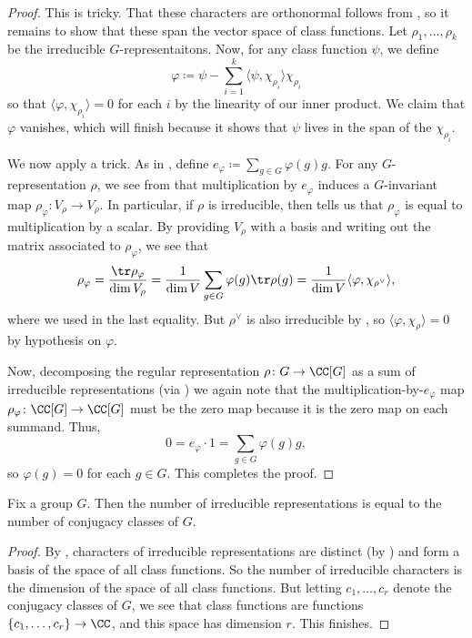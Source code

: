 \documentclass[../main.tex]{subfiles}
\begin{document}
\begin{proof}
	This is tricky. That these characters are orthonormal follows from , so it remains to show that these span the vector space of class functions. Let $\rho_1,\ldots,\rho_k$ be the irreducible $G$-representaitons. Now, for any class function $\psi$, we define
	\[\varphi\coloneqq\psi-\sum_{i=1}^k\langle\psi,\chi_{\rho_i}\rangle\chi_{\rho_i}\]
	so that $\langle\varphi,\chi_{\rho_i}\rangle=0$ for each $i$ by the linearity of our inner product. We claim that $\varphi$ vanishes, which will finish because it shows that $\psi$ lives in the span of the $\chi_{\rho_i}$.

	We now apply a trick. As in , define $e_\varphi\coloneqq\sum_{g\in G}\varphi(g)g$. For any $G$-representation $\rho$, we see from  that multiplication by $e_\varphi$ induces a $G$-invariant map $\rho_\varphi\colon V_\rho\to V_\rho$. In particular, if $\rho$ is irreducible, then  tells us that $\rho_\varphi$ is equal to multiplication by a scalar. By providing $V_\rho$ with a basis and writing out the matrix associated to $\rho_\varphi$, we see that
	\[\rho_\varphi=\frac{\tr\rho_\varphi}{\dim V_\rho}=\frac1{\dim V}\sum_{g\in G}\varphi(g)\tr\rho(g)=\frac1{\dim V}\langle\varphi,\chi_{\rho^\lor}\rangle,\]
	where we used  in the last equality. But $\rho^\lor$ is also irreducible by , so $\langle\varphi,\chi_\rho\rangle=0$ by hypothesis on $\varphi$.

	Now, decomposing the regular representation $\rho\colon G\to\CC[G]$ as a sum of irreducible representations (via ) we again note that the multiplication-by-$e_\varphi$ map $\rho_\varphi\colon\CC[G]\to\CC[G]$ must be the zero map because it is the zero map on each summand. Thus,
	\[0=e_\varphi\cdot1=\sum_{g\in G}\varphi(g)g,\]
	so $\varphi(g)=0$ for each $g\in G$. This completes the proof.
\end{proof}
\begin{corollary} \label{cor:num-irreps}
	Fix a group $G$. Then the number of irreducible representations is equal to the number of conjugacy classes of $G$.
\end{corollary}
\begin{proof}
	By , characters of irreducible representations are distinct (by ) and form a basis of the space of all class functions. So the number of irreducible characters is the dimension of the space of all class functions. But letting $c_1,\ldots,c_r$ denote the conjugacy classes of $G$, we see that class functions are functions $\{c_1,\ldots,c_r\}\to\CC$, and this space has dimension $r$. This finishes.
\end{proof}
\end{document}

